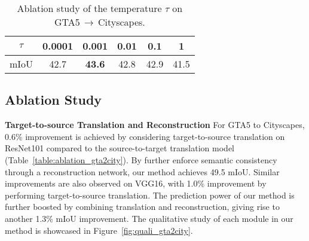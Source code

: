 \documentclass[runningheads]{llncs}
\begin{document}
	\begin{table}[t]
		\caption{Ablation study of the temperature $ \tau $ on GTA5$\,\to\,$Cityscapes.}
		\label{table:ablation_temperature}
		
		\footnotesize
		\setlength\tabcolsep{10pt}
		\begin{center}
			\begin{tabularx}{.7\textwidth}{ cccccc @{} }
				\toprule
$ \tau $ & 0.0001 & 0.001 & 0.01 & 0.1 & 1 \\
				\midrule
				mIoU & 42.7 & \bf 43.6 & 42.8 & 42.9 & 41.5 \\
				\bottomrule
			\end{tabularx}
		\end{center}
	\end{table}
	
	\subsection{Ablation Study}
	
	{\textbf{Target-to-source Translation and Reconstruction}} For GTA5 to Cityscapes, 0.6\% improvement is achieved by considering target-to-source translation on ResNet101 compared to the source-to-target translation model (Table~\ref{table:ablation_gta2city}). By further enforce semantic consistency through a reconstruction network, our method achieves 49.5 mIoU. Similar improvements are also observed on VGG16, with 1.0\% improvement by performing target-to-source translation. The prediction power of our method is further boosted by combining translation and reconstruction, giving rise to another 1.3\% mIoU improvement. The qualitative study of each module in our method is showcased in Figure~\ref{fig:quali_gta2city}.
	\begin{comment}
		\begin{table}
		\caption{Ablation study on SYNTHIA$\,\to\,$Cityscapes.}
		\label{table:ablation_synthia2city}
		
		\footnotesize
		\setlength\tabcolsep{5pt}
		\begin{center}
			\begin{tabularx}{.59\textwidth}{ cccc|c @{} }
				\toprule
Base & S$\,\to\,$T &  T$\,\to\,$S & Reconstruction & \bf mIoU \\
				\midrule
R & \cmark & & & 51.4 \\
				R & & \cmark & & 52.0 \\
				R & & \cmark & \cmark & 53.1 \\
				
				\midrule
V & \cmark & & & 39.0 \\
				V & & \cmark & & 40.1 \\
				V & & \cmark & \cmark & 41.1 \\
				
				\bottomrule
			\end{tabularx}
		\end{center}
\end{table}
	\end{comment}
	
\end{document}
